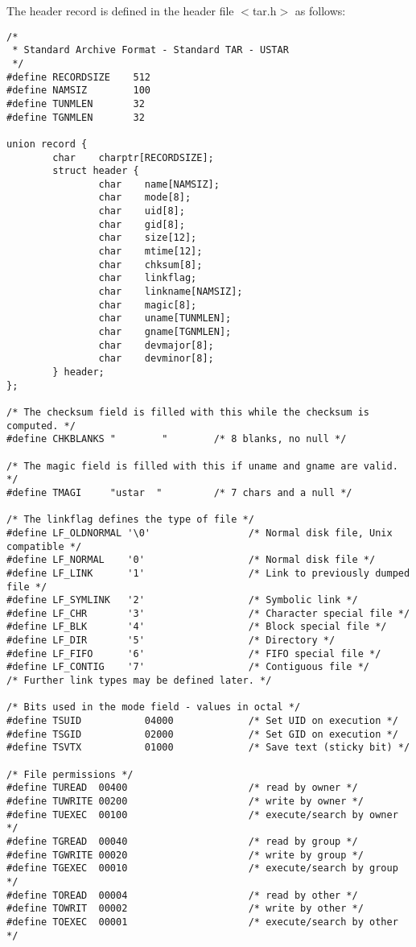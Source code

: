The header record is defined in the header file $<$tar.h$>$ as follows:
\par\vspace{0.5ex}
\begin{verbatim}
/*
 * Standard Archive Format - Standard TAR - USTAR
 */
#define RECORDSIZE    512
#define NAMSIZ        100
#define TUNMLEN       32
#define TGNMLEN       32

union record {
        char    charptr[RECORDSIZE];
        struct header {
                char    name[NAMSIZ];
                char    mode[8];
                char    uid[8];
                char    gid[8];
                char    size[12];
                char    mtime[12];
                char    chksum[8];
                char    linkflag;
                char    linkname[NAMSIZ];
                char    magic[8];
                char    uname[TUNMLEN];
                char    gname[TGNMLEN];
                char    devmajor[8];
                char    devminor[8];
        } header;
};

/* The checksum field is filled with this while the checksum is computed. */
#define CHKBLANKS "        "        /* 8 blanks, no null */

/* The magic field is filled with this if uname and gname are valid. */
#define TMAGI     "ustar  "         /* 7 chars and a null */

/* The linkflag defines the type of file */
#define LF_OLDNORMAL '\0'                 /* Normal disk file, Unix compatible */
#define LF_NORMAL    '0'                  /* Normal disk file */
#define LF_LINK      '1'                  /* Link to previously dumped file */
#define LF_SYMLINK   '2'                  /* Symbolic link */
#define LF_CHR       '3'                  /* Character special file */
#define LF_BLK       '4'                  /* Block special file */
#define LF_DIR       '5'                  /* Directory */
#define LF_FIFO      '6'                  /* FIFO special file */
#define LF_CONTIG    '7'                  /* Contiguous file */
/* Further link types may be defined later. */

/* Bits used in the mode field - values in octal */
#define TSUID           04000             /* Set UID on execution */
#define TSGID           02000             /* Set GID on execution */
#define TSVTX           01000             /* Save text (sticky bit) */

/* File permissions */
#define TUREAD  00400                     /* read by owner */
#define TUWRITE 00200                     /* write by owner */
#define TUEXEC  00100                     /* execute/search by owner */
#define TGREAD  00040                     /* read by group */
#define TGWRITE 00020                     /* write by group */
#define TGEXEC  00010                     /* execute/search by group */
#define TOREAD  00004                     /* read by other */
#define TOWRIT  00002                     /* write by other */
#define TOEXEC  00001                     /* execute/search by other */
\end{verbatim}
